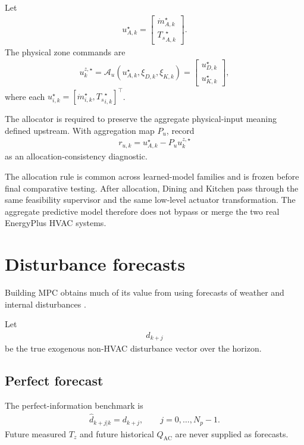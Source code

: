 \documentclass[11pt]{article}
\newcommand{\Ts}{T_s}
\newcommand{\Tz}{T_z}
\newcommand{\mdot}{\dot m}
\newcommand{\QAC}{Q_{\mathrm{AC}}}
\begin{document}
Let
\begin{align}
u_{A,k}^{\star}
=
\begin{bmatrix}
\mdot_{A,k}^{\star}\\
{\Ts}_{A,k}^{\star}
\end{bmatrix}.
\tag{6.40}
\end{align}
The physical zone commands are
\begin{align}
\boxed{
u_{k}^{z,\star}
=
\mathcal A_u
\left(
u_{A,k}^{\star},
\xi_{D,k},
\xi_{K,k}
\right)
=
\begin{bmatrix}
u_{D,k}^{\star}\\
u_{K,k}^{\star}
\end{bmatrix},
}
\tag{6.41}
\end{align}
where each \(u_{i,k}^{\star}=[\mdot_{i,k}^\star,{\Ts}_{i,k}^\star]^\top\).

The allocator is required to preserve the aggregate physical-input meaning
defined upstream.  With aggregation map \(P_u\), record
\begin{align}
\boxed{
r_{u,k}
=
u_{A,k}^{\star}
-
P_u u_{k}^{z,\star}
}
\tag{6.42}
\end{align}
as an allocation-consistency diagnostic.

The allocation rule is common across learned-model families and is frozen
before final comparative testing.  After allocation, Dining and Kitchen pass
through the same feasibility supervisor and the same low-level actuator
transformation.  The aggregate predictive model therefore does not bypass or
merge the two real EnergyPlus HVAC systems.

\section{Disturbance forecasts}

Building MPC obtains much of its value from using forecasts of weather and internal disturbances
\citep{killian2016ten,oldewurtel2014stochastic,drgona2020all}.

Let
\begin{align}
d_{k+j}
\end{align}
be the true exogenous non-HVAC disturbance vector over the horizon.

\subsection{Perfect forecast}

The perfect-information benchmark is
\begin{align}
\boxed{
\widehat d_{k+j|k}
=
d_{k+j},
\qquad
j=0,\ldots,N_p-1.
}
\tag{6.42}
\end{align}
Future measured \(\Tz\) and future historical \(\QAC\) are never supplied as forecasts.
\end{document}

